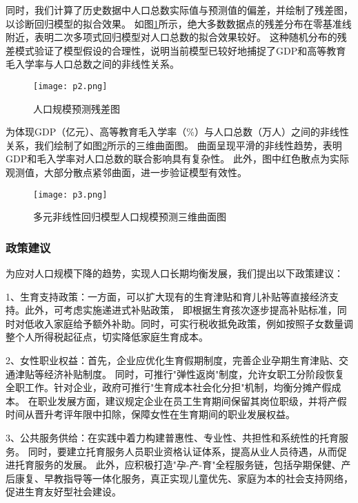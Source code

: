 \documentclass[withoutpreface,bwprint]{cumcmthesis} %
\newcommand{\upcite}[1]{\textsuperscript{\textsuperscript{\cite{#1}}}}
\begin{document}
同时，我们计算了历史数据中人口总数实际值与预测值的偏差，并绘制了残差图，以诊断回归模型的拟合效果。
如图\ref{quetion1.2}所示，绝大多数数据点的残差分布在零基准线附近，表明二次多项式回归模型对人口总数的拟合效果较好。
这种随机分布的残差模式验证了模型假设的合理性，说明当前模型已较好地捕捉了GDP和高等教育毛入学率与人口总数之间的非线性关系。

\begin{figure}[H]
    \centering
    \caption{人口规模预测残差图}
    \texttt{[image: p2.png]} %
    \label{quetion1.2} %
\end{figure}

为体现GDP（亿元）、高等教育毛入学率（\%）与人口总数（万人）之间的非线性关系，我们绘制了如图\ref{quetion1.3}所示的三维曲面图。
曲面呈现平滑的非线性趋势，表明GDP和毛入学率对人口总数的联合影响具有复杂性。
此外，图中红色散点为实际观测值，大部分散点紧邻曲面，进一步验证模型有效性。

\begin{figure}[H]
    \centering
    \caption{多元非线性回归模型人口规模预测三维曲面图}
    \texttt{[image: p3.png]} %
    \label{quetion1.3} %
\end{figure}

\subsubsection{政策建议}
为应对人口规模下降的趋势，实现人口长期均衡发展，我们提出以下政策建议：

1、生育支持政策：一方面，可以扩大现有的生育津贴和育儿补贴等直接经济支持\upcite{经济支持}。此外，可考虑实施递进式补贴政策，
即根据生育孩次逐步提高补贴标准，同时对低收入家庭给予额外补助。同时，可实行税收抵免政策，例如按照子女数量调整个人所得税起征点，切实降低家庭生育成本。

2、女性职业权益：首先，企业应优化生育假期制度，完善企业孕期生育津贴、交通津贴等经济补贴制度\upcite{女性职业}。
同时，可推行"弹性返岗"制度，允许女职工分阶段恢复全职工作。针对企业，政府可推行"生育成本社会化分担"机制，均衡分摊产假成本。
在职业发展方面，建议规定企业在员工生育期间保留其岗位职级，并将产假时间从晋升考评年限中扣除，保障女性在生育期间的职业发展权益。

3、公共服务供给：在实践中着力构建普惠性、专业性、共担性和系统性的托育服务。
同时，要建立托育服务人员职业资格认证体系，提高从业人员待遇，从而促进托育服务的发展。
此外，应积极打造"孕-产-育"全程服务链，包括孕期保健、产后康复、早教指导等一体化服务，真正实现儿童优先、家庭为本的社会支持网络，促进生育友好型社会建设\upcite{托育服务}。
\end{document}
